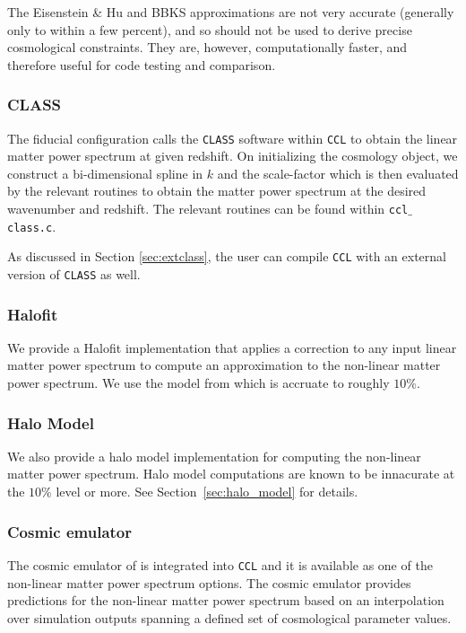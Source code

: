 \documentclass[\docopts]{\docclass}
\newcommand{\ccl}{{\tt CCL}\xspace}
\begin{document}
The Eisenstein \& Hu and BBKS approximations are not very accurate
(generally only to within a few percent), and so should not be used to derive
precise cosmological constraints. They are, however, computationally faster,
and therefore useful for code testing and comparison.

\subsubsection{CLASS}
The fiducial configuration calls the {\tt CLASS} software \citep{class} within \ccl to obtain the
linear matter power spectrum at given redshift. On initializing the cosmology object, we construct a
bi-dimensional spline in $k$ and the scale-factor which is then evaluated by the relevant routines
to obtain the matter power spectrum at the desired wavenumber and redshift. The relevant routines
can be found within {\tt ccl$\_$class.c}.

As discussed in Section \ref{sec:extclass}, the user can compile \ccl with an external version of {\tt CLASS} as well.

\subsubsection{Halofit}
We provide a Halofit implementation that applies a correction to any input linear matter power spectrum
to compute an approximation to the non-linear matter power spectrum. We use the model from \citet{CLASS_halofit}
which is accruate to roughly $10\%$.

\subsubsection{Halo Model}
We also provide a halo model implementation for computing the non-linear matter power spectrum. Halo model
computations are known to be innacurate at the $10\%$ level or more. See Section~\ref{sec:halo_model} for
details.

\subsubsection{Cosmic emulator}

The cosmic emulator of \citet{Lawrence17} is integrated into \ccl and it is available as one of the non-linear matter power spectrum
options. The cosmic emulator provides predictions for the non-linear matter power spectrum based on an
interpolation over simulation outputs spanning a defined set of cosmological parameter values.
\end{document}
